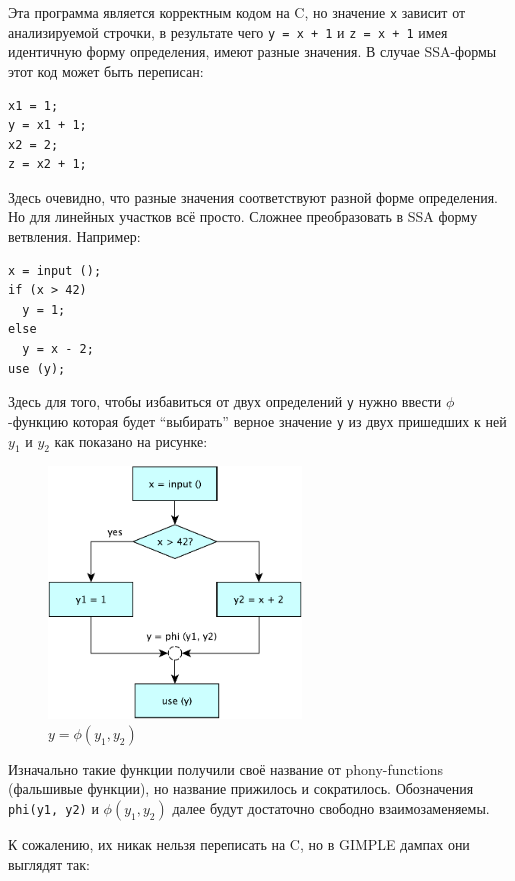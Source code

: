 \documentclass[a4paper,12pt,oneside]{article}
\begin{document}
Эта программа является корректным кодом на C, но значение \lstinline!x! зависит от анализируемой строчки, в результате чего \lstinline!y = x + 1! и \lstinline!z = x + 1! имея идентичную форму определения, имеют разные значения. В случае SSA-формы этот код может быть переписан:

\begin{lstlisting}
x1 = 1;
y = x1 + 1;
x2 = 2;
z = x2 + 1;
\end{lstlisting}

Здесь очевидно, что разные значения соответствуют разной форме определения. Но для линейных участков всё просто. Сложнее преобразовать в SSA форму ветвления. Например:

\begin{lstlisting}
x = input ();
if (x > 42)
  y = 1;
else
  y = x - 2;
use (y);
\end{lstlisting}

Здесь для того, чтобы избавиться от двух определений \lstinline!y! нужно ввести $\phi$-функцию которая будет ``выбирать'' верное значение \lstinline!y! из двух пришедших к ней $y_1$ и $y_2$ как показано на рисунке:

\begin{figure}[h!]
\centering
\includegraphics[width=0.6\textwidth]{illustrations/ssa-romb-crop.pdf}
\caption{$y = \phi(y_1, y_2)$}
\label{fig:ssa_romb_scheme}
\end{figure}

Изначально такие функции получили своё название от phony-functions (фальшивые функции), но название прижилось и сократилось. Обозначения \lstinline!phi(y1, y2)! и $\phi(y_1, y_2)$ далее будут достаточно свободно взаимозаменяемы.

К сожалению, их никак нельзя переписать на C, но в GIMPLE дампах они выглядят так:
\end{document}
